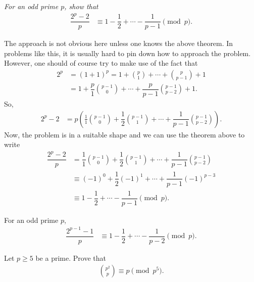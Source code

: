 \documentclass[12pt]{subfile}
\begin{document}
		\begin{problem}\slshape
			For an odd prime $p$, show that
				\begin{align*}
					\dfrac{2^p-2}{p} & \equiv1-\dfrac{1}{2}+\cdots-\dfrac{1}{p-1}\pmod p.
				\end{align*}
		\end{problem}
		
		\begin{solution}
			The approach is not obvious here unless one knows the above theorem. In problems like this, it is usually hard to pin down how to approach the problem. However, one should of course try to make use of the fact that
				\begin{align*}
					2^p & = (1+1)^p = 1+\binom{p}{1}+\cdots+\binom{p}{p-1}+1\\
					& = 	1+\dfrac{p}{1}\binom{p-1}{0}+\cdots+\dfrac{p}{p-1}\binom{p-1}{p-2}+1.
				\end{align*}
			So,
				\begin{align*}
					2^p-2&= p\left(\frac{1}{1}\binom{p-1}{0}+\dfrac{1}{2}\binom{p-1}{1}+\cdots+\dfrac{1}{p-1}\binom{p-1}{p-2}\right).
				\end{align*}
			Now, the problem is in a suitable shape and we can use the theorem above to write
				\begin{align*}
					\dfrac{2^p-2}{p}& = \dfrac{1}{1}\binom{p-1}{0}+\dfrac{1}{2}\binom{p-1}{1}+\cdots+\dfrac{1}{p-1}\binom{p-1}{p-2}\\
					& \equiv(-1)^0+\dfrac{1}{2}(-1)^1+\cdots+\dfrac{1}{p-1}(-1)^{p-3}\\
					& \equiv1-\dfrac{1}{2}+\cdots-\dfrac{1}{p-1}\pmod p.
				\end{align*}
			
		\end{solution}
		
		\begin{corollary}
			For an odd prime $p$,
				\begin{align*}
					\dfrac{2^{p-1}-1}{p} & \equiv1-\dfrac{1}{2}+\cdots-\dfrac{1}{p-2}\pmod p.
				\end{align*}
		\end{corollary}
					
		\begin{problem}
			Let $p \geq 5$ be a prime. Prove that
				\begin{align*}
					\binom{p^2}{p} \equiv p \pmod{p^5}.
				\end{align*}
		\end{problem}
		
\end{document}
